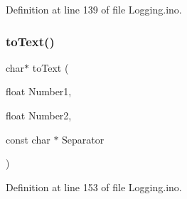 Definition at line 139 of file Logging.\+ino.

\mbox{\label{_logging_8ino_a83d30b216f8ed6672a7b08515c9ad5d8}} 
\subsubsection{\texorpdfstring{toText()}{toText()}\hspace{0.1cm}{\footnotesize\ttfamily [5/5]}}
{\footnotesize\ttfamily char$\ast$ to\+Text (\begin{DoxyParamCaption}\item[{float}]{Number1,  }\item[{float}]{Number2,  }\item[{const char $\ast$}]{Separator }\end{DoxyParamCaption})}



Definition at line 153 of file Logging.\+ino.

